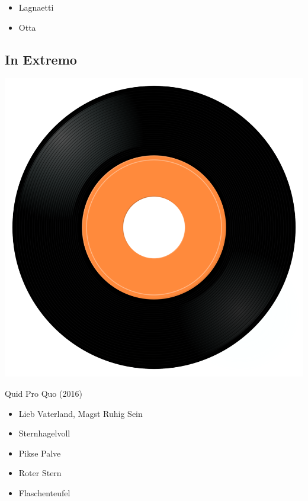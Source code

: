 \begin{minipage}[t]{0.25\textwidth}\vspace{0pt}
\begin{itemize}[nosep,leftmargin=1em,labelwidth=*,align=left]
	\setlength{\itemsep}{0pt}
	\item Lagnaetti
	\item Otta
\end{itemize}
\end{minipage}

\subsection{In Extremo}

\begin{minipage}[t]{0.25\textwidth}
\captionsetup{type=figure}
\includegraphics[width=\textwidth]{Images/cover.png}
\caption*{Quid Pro Quo (2016)}
\end{minipage}
\begin{minipage}[t]{0.25\textwidth}\vspace{0pt}
\begin{itemize}[nosep,leftmargin=1em,labelwidth=*,align=left]
	\setlength{\itemsep}{0pt}
	\item Lieb Vaterland, Magst Ruhig Sein
	\item Sternhagelvoll
	\item Pikse Palve
	\item Roter Stern
	\item Flaschenteufel
\end{itemize}
\end{minipage}

